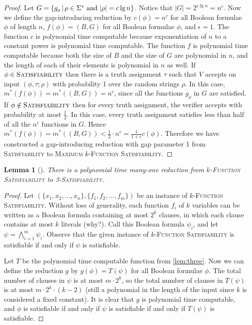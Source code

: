 \documentclass[]{article}
\theoremstyle{plain}
\newtheorem{lemma}{Lemma}
\theoremstyle{definition}
\begin{document}
\begin{proof}
  Let $G = \left\{g_\rho \,\middle|\, \rho \in \Sigma^* \textnormal{ and } |\rho| = c \lg n \right\}$.
  Notice that $|G| = 2^{c \lg n} = n^c$.
  Now we define the gap-introducing reduction by $c(\phi) = n^c$ for all Boolean formulae $\phi$ of length $n$, $f(\phi) = (B, G)$ for all Boolean formulae $\phi$, and $\epsilon = 1$.
  The function $c$ is polynomial time computable because exponentiation of $n$ to a constant power is polynomial time computable.
  The function $f$ is polynomial time computable because both the size of $B$ and the size of $G$ are polynomial in $n$, and the length of each of their elements is polynomial in $n$ as well.
  If $\phi \in \textsc{Satisfiability}$ then there is a truth assignment $\tau$ such that $V$ accepts on input $(\phi, \tau; \rho)$ with probability 1 over the random strings $\rho$.
  In this case, $m^*(f(\phi)) = m^*((B, G)) = n^c$, since all the functions $g_\rho$ in $G$ are satisfied.
  If $\phi \notin \textsc{Satisfiability}$ then for every truth assignment, the verifier accepts with probability at most $\frac{1}{2}$.
  In this case, every truth assignment satisfies less than half of all the $n^c$ functions in $G$.
  Hence $m^*(f(\phi)) = m^*((B, G)) < \frac{1}{2} \cdot n^c = \frac{1}{1 + \epsilon} c(\phi)$.
  Therefore we have constructed a gap-introducing reduction with gap parameter 1 from \textsc{Satisfiability} to \textsc{Maximum $k$-Function Satisfiability}.
\end{proof}

\begin{lemma}[{\cite[Proof of Theorem~29.7]{vazirani}}]\label{lem:decision}
  There is a polynomial time many-one reduction from \textsc{$k$-Function Satisfiability} to \textsc{3-Satisfiability}.
\end{lemma}
\begin{proof}
  Let $(\{x_1, x_2, \ldots, x_n\}, \{f_1, f_2, \ldots, f_m\})$ be an instance of \textsc{$k$-Function Satisfiability}.
  Without loss of generality, each function $f_i$ of $k$ variables can be written as a Boolean formula containing at most $2^k$ clauses, in which each clause contains at most $k$ literals (why?).
  Call this Boolean formula $\psi_i$, and let $\psi = \bigwedge_{i = 1}^m{\psi_i}$.
  Observe that the given instance of \textsc{$k$-Function Satisfiability} is satisfiable if and only if $\psi$ is satisfiable.

  Let $T$ be the polynomial time computable function from \autoref{lem:three}.
  Now we can define the reduction $g$ by $g(\phi) = T(\psi)$ for all Boolean formulae $\phi$.
  The total number of clauses in $\psi$ is at most $m \cdot 2 ^ k$, so the total number of clauses in $T(\psi)$ is at most $m \cdot 2^k \cdot (k - 2)$ (still a polynomial in the length of the input since $k$ is considered a fixed constant).
  It is clear that $g$ is polynomial time computable, and $\phi$ is satisfiable if and only if $\psi$ is satisfiable if and only if $T(\psi)$ is satisfiable.
\end{proof}
\end{document}
